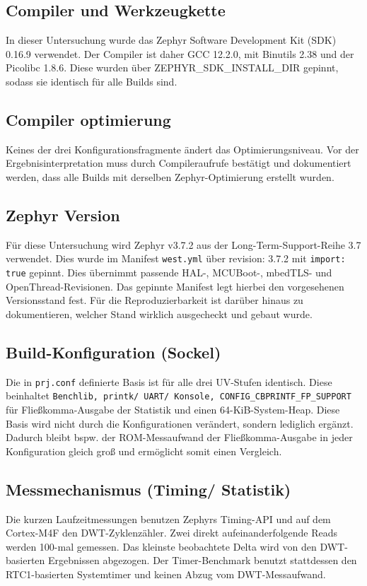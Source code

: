 \subsection{Compiler und Werkzeugkette}
In dieser Untersuchung wurde das Zephyr Software Development Kit (SDK) 0.16.9 verwendet. Der Compiler ist daher GCC 12.2.0, mit Binutils 2.38 und der Picolibc 1.8.6. Diese wurden über ZEPHYR\_SDK\_INSTALL\_DIR gepinnt, sodass sie identisch für alle Builds sind.

\subsection{Compiler optimierung}
Keines der drei Konfigurationsfragmente ändert das Optimierungsniveau. Vor der Ergebnisinterpretation muss durch Compileraufrufe bestätigt und dokumentiert werden, dass alle Builds mit derselben Zephyr-Optimierung erstellt wurden.

\subsection{Zephyr Version}
Für diese Untersuchung wird Zephyr v3.7.2 aus der Long-Term-Support-Reihe 3.7 verwendet. Dies wurde im Manifest \lstinline[style=fileinline]|west.yml| über revision: 3.7.2 mit \lstinline[style=fileinline]|import: true| gepinnt. Dies übernimmt passende HAL-, MCUBoot-, mbedTLS- und OpenThread-Revisionen. Das gepinnte Manifest legt hierbei den vorgesehenen Versionsstand fest. Für die Reproduzierbarkeit ist darüber hinaus zu dokumentieren, welcher Stand wirklich ausgecheckt und gebaut wurde.

\subsection{Build-Konfiguration (Sockel)}
Die in \lstinline[style=fileinline]|prj.conf| definierte Basis ist für alle drei UV-Stufen identisch. Diese beinhaltet \lstinline[style=fileinline]|Benchlib, printk/ UART/ Konsole, CONFIG_CBPRINTF_FP_SUPPORT| für Fließkomma-Ausgabe der Statistik und einen 64-KiB-System-Heap. Diese Basis wird nicht durch die Konfigurationen verändert, sondern lediglich ergänzt. Dadurch bleibt bspw. der ROM-Messaufwand der Fließkomma-Ausgabe in jeder Konfiguration gleich groß und ermöglicht somit einen Vergleich.

\subsection{Messmechanismus (Timing/ Statistik)}
Die kurzen Laufzeitmessungen benutzen Zephyrs Timing-API und auf dem Cortex-M4F den DWT-Zyklenzähler. Zwei direkt aufeinanderfolgende Reads werden 100-mal gemessen. Das kleinste beobachtete Delta wird von den DWT-basierten Ergebnissen abgezogen. Der Timer-Benchmark benutzt stattdessen den RTC1-basierten Systemtimer und keinen Abzug vom DWT-Messaufwand.

